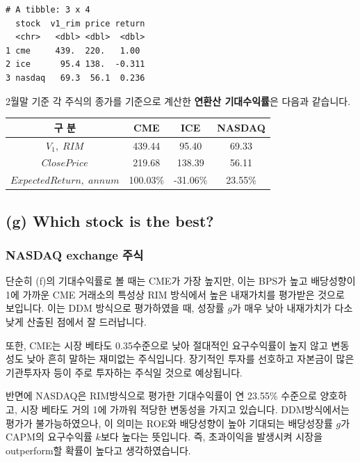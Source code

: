 \documentclass[
  a4paper,
  DIV=11,
  numbers=noendperiod]{scrreprt}
\begin{document}
\begin{verbatim}
# A tibble: 3 x 4
  stock  v1_rim price return
  <chr>   <dbl> <dbl>  <dbl>
1 cme     439.  220.   1.00 
2 ice      95.4 138.  -0.311
3 nasdaq   69.3  56.1  0.236
\end{verbatim}

2월말 기준 각 주식의 종가를 기준으로 계산한 \textbf{연환산 기대수익률}은
다음과 같습니다.

\begin{longtable}[]{@{}cccc@{}}
\toprule\noalign{}
구 분 & CME & ICE & NASDAQ \\
\midrule\noalign{}
\endhead
\bottomrule\noalign{}
\endlastfoot
\(V_1,\; RIM\) & 439.44 & 95.40 & 69.33 \\
\(Close Price\) & 219.68 & 138.39 & 56.11 \\
\textbf{\(Expected Return,\; annum\)} & 100.03\% & -31.06\% & 23.55\% \\
\end{longtable}

\subsection*{(g) Which stock is the
best?}\label{g-which-stock-is-the-best}

\subsubsection*{\texorpdfstring{\textbf{NASDAQ exchange
주식}}{NASDAQ exchange 주식}}\label{nasdaq-exchange-uxc8fcuxc2dd}

단순히 (f)의 기대수익률로 볼 때는 CME가 가장 높지만, 이는 BPS가 높고
배당성향이 1에 가까운 CME 거래소의 특성상 RIM 방식에서 높은 내재가치를
평가받은 것으로 보입니다. 이는 DDM 방식으로 평가하였을 때, 성장률
\(g\)가 매우 낮아 내재가치가 다소 낮게 산출된 점에서 잘 드러납니다.

또한, CME는 시장 베타도 0.35수준으로 낮아 절대적인 요구수익률이 높지
않고 변동성도 낮아 흔히 말하는 재미없는 주식입니다. 장기적인 투자를
선호하고 자본금이 많은 기관투자자 등이 주로 투자하는 주식일 것으로
예상됩니다.

반면에 NASDAQ은 RIM방식으로 평가한 기대수익률이 연 23.55\% 수준으로
양호하고, 시장 베타도 거의 1에 가까워 적당한 변동성을 가지고 있습니다.
DDM방식에서는 평가가 불가능하였으나, 이 의미는 ROE와 배당성향이 높아
기대되는 배당성장률 \(g\)가 CAPM의 요구수익률 \(k\)보다 높다는 뜻입니다.
즉, 초과이익을 발생시켜 시장을 outperform할 확률이 높다고
생각하였습니다.
\end{document}
